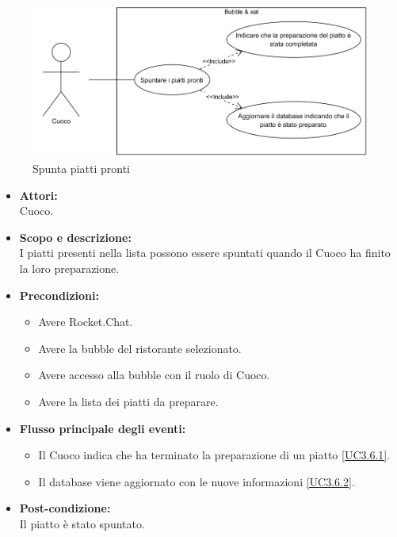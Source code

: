 
\begin{figure}[H]
	\centering
	\includegraphics[width=15cm]{../../documenti/AnalisiDeiRequisiti/Diagrammi_img/uc3_6.png}
	\caption{\UCCaption{} Spunta piatti pronti}
\end{figure}

\begin{itemize}
	\item \textbf{Attori:}
	\\Cuoco.
	\item \textbf{Scopo e descrizione:} 
	\\I piatti presenti nella lista possono essere spuntati quando il Cuoco ha finito la loro preparazione.
	\item \textbf{Precondizioni:}
	\begin{itemize}
		\item Avere Rocket.Chat.
		\item Avere la bubble del ristorante selezionato.
		\item Avere accesso alla bubble con il ruolo di Cuoco.
		\item Avere la lista dei piatti da preparare.
	\end{itemize}
	\item \textbf{Flusso principale degli eventi:}
	\begin{itemize}
		\item Il Cuoco indica che ha terminato la preparazione di un piatto \ref{UC3.6.1}.
		\item Il database viene aggiornato con le nuove informazioni \ref{UC3.6.2}.
	\end{itemize}
	\item \textbf{Post-condizione:}
	\\Il piatto è stato spuntato.
\end{itemize}


